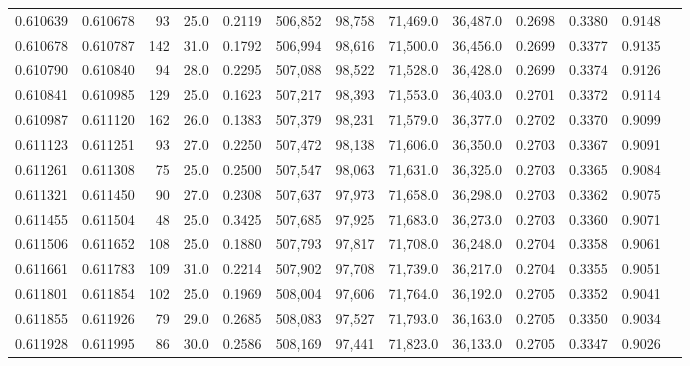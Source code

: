 \begin{tabular}{rrrrrrrrrrrrr}
0.610639 & 0.610678 &    93 & 25.0 &                                     0.2119 & 506,852 &  98,758 &  71,469.0 &  36,487.0 & 0.2698 & 0.3380 & 0.9148 \\
0.610678 & 0.610787 &   142 & 31.0 &                                     0.1792 & 506,994 &  98,616 &  71,500.0 &  36,456.0 & 0.2699 & 0.3377 & 0.9135 \\
0.610790 & 0.610840 &    94 & 28.0 &                                     0.2295 & 507,088 &  98,522 &  71,528.0 &  36,428.0 & 0.2699 & 0.3374 & 0.9126 \\
0.610841 & 0.610985 &   129 & 25.0 &                                     0.1623 & 507,217 &  98,393 &  71,553.0 &  36,403.0 & 0.2701 & 0.3372 & 0.9114 \\
0.610987 & 0.611120 &   162 & 26.0 &                                     0.1383 & 507,379 &  98,231 &  71,579.0 &  36,377.0 & 0.2702 & 0.3370 & 0.9099 \\
0.611123 & 0.611251 &    93 & 27.0 &                                     0.2250 & 507,472 &  98,138 &  71,606.0 &  36,350.0 & 0.2703 & 0.3367 & 0.9091 \\
0.611261 & 0.611308 &    75 & 25.0 &                                     0.2500 & 507,547 &  98,063 &  71,631.0 &  36,325.0 & 0.2703 & 0.3365 & 0.9084 \\
0.611321 & 0.611450 &    90 & 27.0 &                                     0.2308 & 507,637 &  97,973 &  71,658.0 &  36,298.0 & 0.2703 & 0.3362 & 0.9075 \\
0.611455 & 0.611504 &    48 & 25.0 &                                     0.3425 & 507,685 &  97,925 &  71,683.0 &  36,273.0 & 0.2703 & 0.3360 & 0.9071 \\
0.611506 & 0.611652 &   108 & 25.0 &                                     0.1880 & 507,793 &  97,817 &  71,708.0 &  36,248.0 & 0.2704 & 0.3358 & 0.9061 \\
0.611661 & 0.611783 &   109 & 31.0 &                                     0.2214 & 507,902 &  97,708 &  71,739.0 &  36,217.0 & 0.2704 & 0.3355 & 0.9051 \\
0.611801 & 0.611854 &   102 & 25.0 &                                     0.1969 & 508,004 &  97,606 &  71,764.0 &  36,192.0 & 0.2705 & 0.3352 & 0.9041 \\
0.611855 & 0.611926 &    79 & 29.0 &                                     0.2685 & 508,083 &  97,527 &  71,793.0 &  36,163.0 & 0.2705 & 0.3350 & 0.9034 \\
0.611928 & 0.611995 &    86 & 30.0 &                                     0.2586 & 508,169 &  97,441 &  71,823.0 &  36,133.0 & 0.2705 & 0.3347 & 0.9026 \\

\end{tabular}
